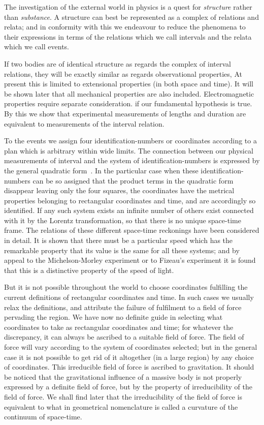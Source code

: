 \documentclass[12pt]{book}
\begin{document}

The investigation of the external world in physics is a quest for \emph{structure}
rather than \emph{substance}. A structure can best be represented as a complex of
relations and relata; and in conformity with this we endeavour to reduce the
phenomena to their expressions in terms of the relations which we call
intervals and the relata which we call events.

If two bodies are of identical structure as regards the complex of interval
relations, they will be exactly similar as regards observational properties\footnotemark,\footnotetext
  {At present this is limited to extensional properties (in both space and time). It will be
  shown later that all mechanical properties are also included. Electromagnetic properties require
  separate consideration.}
if
our fundamental hypothesis is true. By this we show that experimental
measurements of lengths and duration are equivalent to measurements of the
interval relation.

To the events we assign four identification\hyp{}numbers or coordinates
according to a plan which is arbitrary within wide limits. The connection
between our physical measurements of interval and the system of identification\hyp{}numbers
is expressed by the general quadratic form~. In the particular
case when these identification\hyp{}numbers can be so assigned that the product
terms in the quadratic form disappear leaving only the four squares, the
coordinates have the metrical properties belonging to rectangular coordinates
and time, and are accordingly so identified. If any such system exists an
infinite number of others exist connected with it by the Lorentz transformation,
so that there is no unique space-time frame. The relations of
these different space-time reckonings have been considered in detail. It is
shown that there must be a particular speed which has the remarkable
property that its value is the same for all these systems; and by appeal to
the Michelson\hyp{}Morley experiment or to Fizeau's experiment it is found that
this is a distinctive property of the speed of light.

But it is not possible throughout the world to choose coordinates fulfilling
the current definitions of rectangular coordinates and time. In such cases we
usually relax the definitions, and attribute the failure of fulfilment to a field
of force pervading the region. We have now no definite guide in selecting
what coordinates to take as rectangular coordinates and time; for whatever
the discrepancy, it can always be ascribed to a suitable field of force. The
field of force will vary according to the system of coordinates selected; but in
the general case it is not possible to get rid of it altogether (in a large region)
by any choice of coordinates. This irreducible field of force is ascribed to
gravitation. It should be noticed that the gravitational influence of a massive
body is not properly expressed by a definite field of force, but by the property
of irreducibility of the field of force. We shall find later that the irreducibility
of the field of force is equivalent to what in geometrical nomenclature is
called a curvature of the continuum of space-time.
\end{document}

